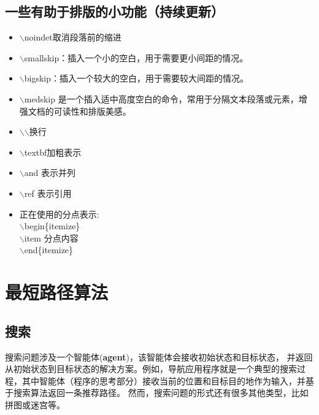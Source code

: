 \subsection{一些有助于排版的小功能（持续更新）}
\begin{itemize}
    \item $\backslash$noindet取消段落前的缩进
    \item$\backslash$smallskip：插入一个小的空白，用于需要更小间距的情况。
 \item$\backslash$bigskip：插入一个较大的空白，用于需要较大间距的情况。
 \item$\backslash$medskip 是一个插入适中高度空白的命令，常用于分隔文本段落或元素，增强文档的可读性和排版美感。
 \item$\backslash$$\backslash$换行
 \item$\backslash$textbf{}加粗表示
 \item$\backslash$and 表示并列
 \item$\backslash$ref 表示引用
 \item 正在使用的分点表示:\\$\backslash$begin\{itemize\}\\$\backslash$item 分点内容\\$\backslash$end\{itemize\}
\end{itemize}
\section{最短路径算法}
\subsection{\textbf{搜索}}
搜索问题涉及一个智能体(\textbf{agent})，该智能体会接收初始状态和目标状态，
并返回从初始状态到目标状态的解决方案。例如，导航应用程序就是一个典型的搜索过程，其中智能体（程序的思考部分）接收当前的位置和目标目的地作为输入，并基于搜索算法返回一条推荐路径。
然而，搜索问题的形式还有很多其他类型，比如拼图或迷宫等。

